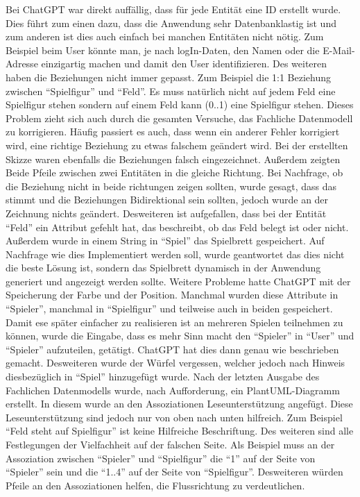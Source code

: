 Bei ChatGPT war direkt auffällig, dass für jede Entität eine ID erstellt wurde. Dies führt zum einen dazu, dass die Anwendung sehr Datenbanklastig ist und zum 
anderen ist dies auch einfach bei manchen Entitäten nicht nötig. Zum Beispiel beim User könnte man, je nach logIn-Daten, den Namen oder die E-Mail-Adresse 
einzigartig machen und damit den User identifizieren. Des weiteren haben die Beziehungen nicht immer gepasst. Zum Beispiel die 1:1 Beziehung zwischen 
``Spielfigur'' und ``Feld''. Es muss natürlich nicht auf jedem Feld eine Spielfigur stehen sondern auf einem Feld kann (0..1) eine Spielfigur stehen. Dieses Problem
zieht sich auch durch die gesamten Versuche, das Fachliche Datenmodell zu korrigieren. Häufig passiert es auch, dass wenn ein anderer Fehler korrigiert wird, 
eine richtige Beziehung zu etwas falschem geändert wird. Bei der erstellten Skizze waren ebenfalls die Beziehungen falsch eingezeichnet. Außerdem zeigten Beide Pfeile 
zwischen zwei Entitäten in die gleiche Richtung. Bei Nachfrage, ob die Beziehung nicht in beide richtungen zeigen sollten, wurde gesagt, dass das stimmt und die 
Beziehungen Bidirektional sein sollten, jedoch wurde an der Zeichnung nichts geändert. Desweiteren ist aufgefallen, dass bei der Entität ``Feld'' ein Attribut gefehlt
hat, das beschreibt, ob das Feld belegt ist oder nicht. Außerdem wurde in einem String in ``Spiel'' das Spielbrett gespeichert. Auf Nachfrage wie dies Implementiert
werden soll, wurde geantwortet das dies nicht die beste Lösung ist, sondern das Spielbrett dynamisch in der Anwendung generiert und angezeigt werden sollte.
Weitere Probleme hatte ChatGPT mit der Speicherung der Farbe und der Position. Manchmal wurden diese Attribute in ``Spieler'', manchmal in ``Spielfigur'' und teilweise
auch in beiden gespeichert. Damit ese später einfacher zu realisieren ist an mehreren Spielen teilnehmen zu können, wurde die Eingabe, dass es mehr Sinn macht den 
``Spieler'' in ``User'' und ``Spieler'' aufzuteilen, getätigt. ChatGPT hat dies dann genau wie beschrieben gemacht. Desweiteren wurde der Würfel vergessen, welcher 
jedoch nach Hinweis diesbezüglich in ``Spiel'' hinzugefügt wurde. Nach der letzten Ausgabe des Fachlichen Datenmodells wurde, nach Aufforderung, ein PlantUML-Diagramm 
erstellt. In diesem wurde an den Assoziationen Leseunterstützung angefügt. Diese Leseunterstützung sind jedoch nur von oben nach unten hilfreich. Zum Beispiel ``Feld 
steht auf Spielfigur'' ist keine Hilfreiche Beschriftung. Des weiteren sind alle Festlegungen der Vielfachheit auf der falschen Seite. Als Beispiel muss an der 
Assoziation zwischen ``Spieler'' und ``Spielfigur'' die ``1'' auf der Seite von ``Spieler'' sein und die ``1..4'' auf der Seite von ``Spielfigur''. Desweiteren würden 
Pfeile an den Assoziationen helfen, die Flussrichtung zu verdeutlichen.\\

